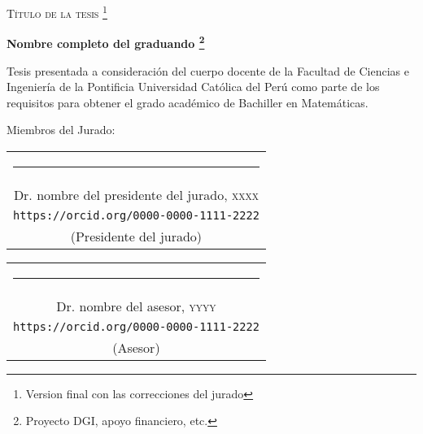 \newpage

\thispagestyle{empty}

\bigskip

\begin{center}
  \textsc{
    T\'itulo de la tesis
    \footnote{Version final con las correcciones del jurado}
  }
\end{center}

\smallskip

\begin{center}
  \textbf{
    Nombre completo del graduando
    \footnote{Proyecto DGI, apoyo financiero, etc.}
  }
\end{center}

\par
\smallskip

Tesis presentada a consideraci\'on del cuerpo docente de la
Facultad de Ciencias e Ingenier\'ia de la
Pontificia Universidad Cat\'olica del Per\'u
como parte de los requisitos para obtener el grado acad\'emico de
Bachiller en Matem\'aticas.

\par
\vspace*{0.5cm}

Miembros del Jurado:

\vspace*{1.0cm}

\begin{center}
  \begin{tabular}{c}
    {\footnotesize \rule{7cm}{0.0009cm}} \\
    {\footnotesize Dr. nombre del presidente del jurado, \textsc{xxxx}} \\
    {\footnotesize \texttt{https://orcid.org/0000-0000-1111-2222}} \\
    {\footnotesize (Presidente del jurado)}
  \end{tabular}
\end{center}

\vspace*{1.0cm}

\begin{center}
  \begin{tabular}{c}
    {\footnotesize \rule{7cm}{0.0009cm}} \\
    {\footnotesize Dr. nombre del asesor, \textsc{yyyy}} \\
    {\footnotesize \texttt{https://orcid.org/0000-0000-1111-2222}} \\
    {\footnotesize (Asesor)}
  \end{tabular}
\end{center}


